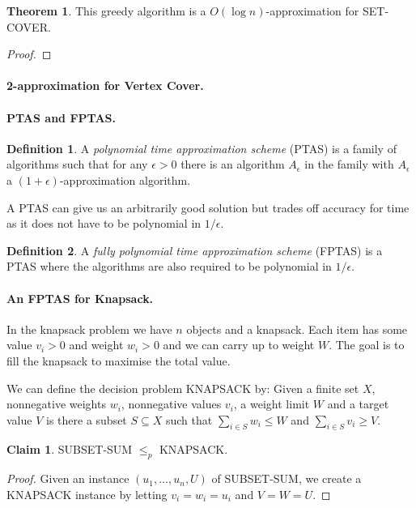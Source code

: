 \documentclass[11pt,a4paper]{article}
\theoremstyle{definition}
\newtheorem{thm}{Theorem}
\newtheorem{claim}{Claim}
\newtheorem{defn}{Definition}
\begin{document}
\begin{thm}
This greedy algorithm is a $O(\log n)$-approximation for SET-COVER.
\end{thm}
\begin{proof}

\end{proof}

\paragraph{2-approximation for Vertex Cover.}

\paragraph{PTAS and FPTAS.}
\begin{defn}
A \emph{polynomial time approximation scheme} (PTAS) is a family of algorithms such that for any $\epsilon > 0$ there is an algorithm $A_\epsilon$ in the family with $A_\epsilon$ a $(1+\epsilon)$-approximation algorithm.
\end{defn}

A PTAS can give us an arbitrarily good solution but trades off accuracy for time as it does not have to be polynomial in $1/\epsilon$.

\begin{defn}
A \emph{fully polynomial time approximation scheme} (FPTAS) is a PTAS where the algorithms are also required to be polynomial in $1/\epsilon$.
\end{defn}

\paragraph{An FPTAS for Knapsack.}
In the knapsack problem we have $n$ objects and a knapsack.
Each item has some value $v_i>0$ and weight $w_i>0$ and we can carry up to weight $W$.
The goal is to fill the knapsack to maximise the total value.

We can define the decision problem KNAPSACK by: Given a finite set $X$, nonnegative weights $w_i$, nonnegative values $v_i$, a weight limit $W$ and a target value $V$ is there a subset $S\subseteq X$ such that $\sum_{i\in S} w_i \le W$ and $\sum_{i\in S} v_i \ge V$.

\begin{claim}
SUBSET-SUM $\le_p$ KNAPSACK.
\end{claim}
\begin{proof}
Given an instance $(u_1,\ldots,u_n,U)$ of SUBSET-SUM, we create a KNAPSACK instance by letting $v_i = w_i = u_i$ and $V = W = U$.
\end{proof}
\end{document}
